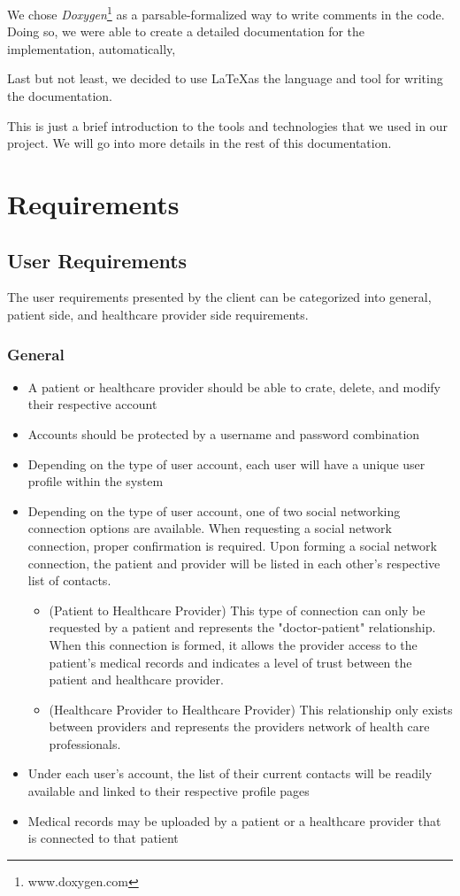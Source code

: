 \documentclass[12pt]{report}
\begin{document}
We chose \emph{Doxygen}\footnote{www.doxygen.com} as a parsable-formalized way to write comments in the code. Doing so, we were able to create a detailed documentation for the implementation, automatically,

Last but not least, we decided to use \LaTeX as the language and tool for writing the documentation.

This is just a brief introduction to the tools and technologies that we used in our project. We will go into more details in the rest of this documentation.


\part{Requirements}
\chapter{User Requirements}
The user requirements presented by the client can be categorized into general, patient side, and healthcare provider side requirements.

\section{General}
\begin{itemize}
\item A patient or healthcare provider should be able to crate, delete, and modify their respective account
\item Accounts should be protected by a username and password combination
\item Depending on the type of user account, each user will have a unique user profile within the system
\item Depending on the type of user account, one of two social networking connection options are available. When requesting a social network connection, proper confirmation is required.  Upon forming a social network connection, the patient and provider will be listed in each other's respective list of contacts.
\begin{itemize}
\item (Patient to Healthcare Provider) This type of connection can only be requested by a patient and represents the "doctor-patient" relationship.  When this connection is formed, it allows the provider access to the patient's medical records and indicates a level of trust between the patient and healthcare provider.
\item (Healthcare Provider to Healthcare Provider) This relationship only exists between providers and represents the providers network of health care professionals.
\end{itemize}
\item Under each user's account, the list of their current contacts will be readily available and linked to their respective profile pages
\item Medical records may be uploaded by a patient or a healthcare provider that is connected to that patient
\end{itemize}
\end{document}
